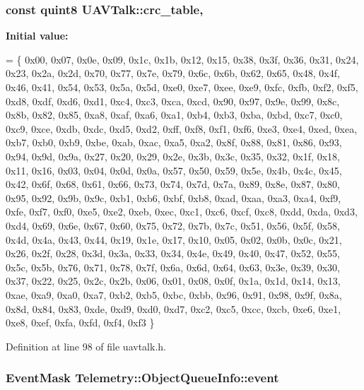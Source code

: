 \hypertarget{group___u_a_v_talk_plugin_gac5c5c810a2edb31ed325bf2d54e1b289}{
\subsubsection[{crc\-\_\-table}]{\setlength{\rightskip}{0pt plus 5cm}const quint8 U\-A\-V\-Talk\-::crc\-\_\-table\hspace{0.3cm}{\ttfamily [static]}, {\ttfamily [protected]}}}\label{group___u_a_v_talk_plugin_gac5c5c810a2edb31ed325bf2d54e1b289}
{\bfseries Initial value\-:}
\begin{DoxyCode}
= \{
    0x00, 0x07, 0x0e, 0x09, 0x1c, 0x1b, 0x12, 0x15, 0x38, 0x3f, 0x36, 0x31, 0x24, 0x23, 0x2a, 0x2d,
    0x70, 0x77, 0x7e, 0x79, 0x6c, 0x6b, 0x62, 0x65, 0x48, 0x4f, 0x46, 0x41, 0x54, 0x53, 0x5a, 0x5d,
    0xe0, 0xe7, 0xee, 0xe9, 0xfc, 0xfb, 0xf2, 0xf5, 0xd8, 0xdf, 0xd6, 0xd1, 0xc4, 0xc3, 0xca, 0xcd,
    0x90, 0x97, 0x9e, 0x99, 0x8c, 0x8b, 0x82, 0x85, 0xa8, 0xaf, 0xa6, 0xa1, 0xb4, 0xb3, 0xba, 0xbd,
    0xc7, 0xc0, 0xc9, 0xce, 0xdb, 0xdc, 0xd5, 0xd2, 0xff, 0xf8, 0xf1, 0xf6, 0xe3, 0xe4, 0xed, 0xea,
    0xb7, 0xb0, 0xb9, 0xbe, 0xab, 0xac, 0xa5, 0xa2, 0x8f, 0x88, 0x81, 0x86, 0x93, 0x94, 0x9d, 0x9a,
    0x27, 0x20, 0x29, 0x2e, 0x3b, 0x3c, 0x35, 0x32, 0x1f, 0x18, 0x11, 0x16, 0x03, 0x04, 0x0d, 0x0a,
    0x57, 0x50, 0x59, 0x5e, 0x4b, 0x4c, 0x45, 0x42, 0x6f, 0x68, 0x61, 0x66, 0x73, 0x74, 0x7d, 0x7a,
    0x89, 0x8e, 0x87, 0x80, 0x95, 0x92, 0x9b, 0x9c, 0xb1, 0xb6, 0xbf, 0xb8, 0xad, 0xaa, 0xa3, 0xa4,
    0xf9, 0xfe, 0xf7, 0xf0, 0xe5, 0xe2, 0xeb, 0xec, 0xc1, 0xc6, 0xcf, 0xc8, 0xdd, 0xda, 0xd3, 0xd4,
    0x69, 0x6e, 0x67, 0x60, 0x75, 0x72, 0x7b, 0x7c, 0x51, 0x56, 0x5f, 0x58, 0x4d, 0x4a, 0x43, 0x44,
    0x19, 0x1e, 0x17, 0x10, 0x05, 0x02, 0x0b, 0x0c, 0x21, 0x26, 0x2f, 0x28, 0x3d, 0x3a, 0x33, 0x34,
    0x4e, 0x49, 0x40, 0x47, 0x52, 0x55, 0x5c, 0x5b, 0x76, 0x71, 0x78, 0x7f, 0x6a, 0x6d, 0x64, 0x63,
    0x3e, 0x39, 0x30, 0x37, 0x22, 0x25, 0x2c, 0x2b, 0x06, 0x01, 0x08, 0x0f, 0x1a, 0x1d, 0x14, 0x13,
    0xae, 0xa9, 0xa0, 0xa7, 0xb2, 0xb5, 0xbc, 0xbb, 0x96, 0x91, 0x98, 0x9f, 0x8a, 0x8d, 0x84, 0x83,
    0xde, 0xd9, 0xd0, 0xd7, 0xc2, 0xc5, 0xcc, 0xcb, 0xe6, 0xe1, 0xe8, 0xef, 0xfa, 0xfd, 0xf4, 0xf3
\}
\end{DoxyCode}


Definition at line 98 of file uavtalk.\-h.

\hypertarget{group___u_a_v_talk_plugin_ga6cc8fb5745c2e3cc2a6e0e4512542d7c}{
\subsubsection[{event}]{\setlength{\rightskip}{0pt plus 5cm}Event\-Mask Telemetry\-::\-Object\-Queue\-Info\-::event}}\label{group___u_a_v_talk_plugin_ga6cc8fb5745c2e3cc2a6e0e4512542d7c}


